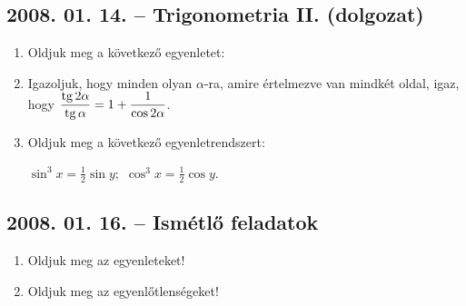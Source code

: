 \subsection*{2008. 01. 14. -- Trigonometria II. (dolgozat)}
\begin{enumerate}
\item Oldjuk meg a következő egyenletet:
\item Igazoljuk, hogy minden olyan $\alpha$-ra, amire értelmezve van mindkét oldal, igaz, hogy
$\displaystyle\frac{\mathop{\mathrm{tg}}\nolimits2\alpha}{\mathop{\mathrm{tg}}\nolimits\alpha}=1+\frac{1}{\cos2\alpha}$.
\item Oldjuk meg a következő egyenletrendszert:

$\displaystyle\sin^3x=\frac{1}{2}\sin y;$
$\displaystyle\cos^3x=\frac{1}{2}\cos y.$
\end{enumerate}

\subsection*{2008. 01. 16. -- Ismétlő feladatok}
\begin{enumerate}
\item Oldjuk meg az egyenleteket!
\item Oldjuk meg az egyenlőtlenségeket!
\end{enumerate}

